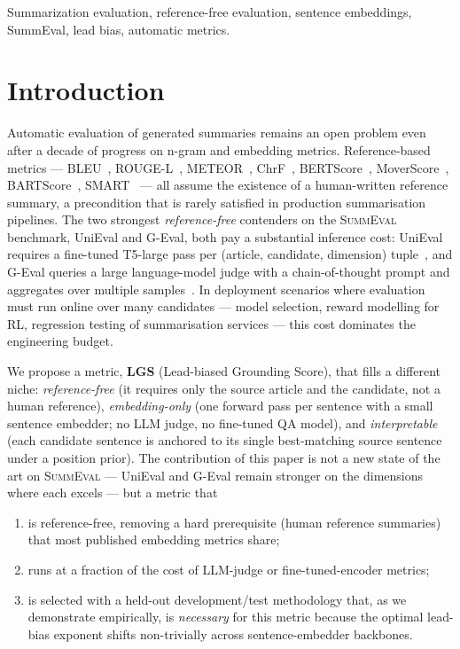 \documentclass[journal]{IEEEtran}
\begin{document}
\begin{IEEEkeywords}
Summarization evaluation, reference-free evaluation, sentence
embeddings, SummEval, lead bias, automatic metrics.
\end{IEEEkeywords}

\section{Introduction}
\label{sec:intro}

Automatic evaluation of generated summaries remains an open
problem even after a decade of progress on n-gram and embedding
metrics. Reference-based metrics --- BLEU~\cite{papineni2002bleu},
ROUGE-L~\cite{lin2004rouge}, METEOR~\cite{banerjee2005meteor},
ChrF~\cite{popovic2015chrf}, BERTScore~\cite{zhang2020bertscore},
MoverScore~\cite{zhao2019moverscore},
BARTScore~\cite{yuan2021bartscore},
SMART~\cite{amplayo2022smart} --- all assume the existence of a
human-written reference summary, a precondition that is rarely
satisfied in production summarisation pipelines. The two strongest
\emph{reference-free} contenders on the
\textsc{SummEval}~\cite{fabbri2021summeval} benchmark, UniEval and
G-Eval, both pay a substantial inference cost: UniEval requires a
fine-tuned T5-large pass per (article, candidate, dimension)
tuple~\cite{zhong2022unieval}, and G-Eval queries a large
language-model judge with a chain-of-thought prompt and aggregates
over multiple samples~\cite{liu2023geval}. In deployment
scenarios where evaluation must run online over many candidates
--- model selection, reward modelling for RL, regression testing
of summarisation services --- this cost dominates the engineering
budget.

We propose a metric, \textbf{LGS} (Lead-biased Grounding Score),
that fills a different niche: \emph{reference-free} (it requires
only the source article and the candidate, not a human reference),
\emph{embedding-only} (one forward pass per sentence with a small
sentence embedder; no LLM judge, no fine-tuned QA model), and
\emph{interpretable} (each candidate sentence is anchored to its
single best-matching source sentence under a position prior). The
contribution of this paper is not a new state of the art on
\textsc{SummEval} --- UniEval and G-Eval remain stronger on the
dimensions where each excels --- but a metric that
\begin{enumerate}
\item is reference-free, removing a hard prerequisite (human
reference summaries) that most published embedding metrics share;
\item runs at a fraction of the cost of LLM-judge or
fine-tuned-encoder metrics;
\item is selected with a held-out development/test methodology that,
as we demonstrate empirically, is \emph{necessary} for this metric
because the optimal lead-bias exponent shifts non-trivially across
sentence-embedder backbones.
\end{enumerate}
\end{document}
